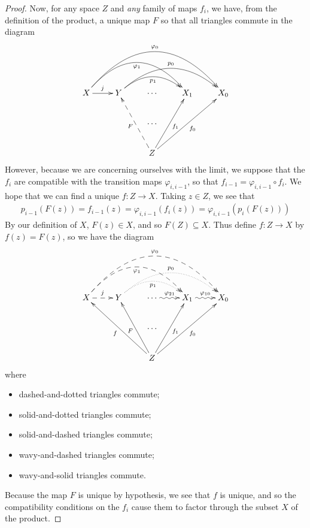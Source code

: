 \begin{proof}
        Now, for any space $Z$ and \emph{any} family of maps $f_i$, we have, from the definition of the product, a unique map $F$ so that all triangles commute in the diagram
        \begin{displaymath}
          \xymatrix{
            X \ar[r]^j \ar@/^37pt/[rrr]_{\varphi_1} \ar@/^50pt/[rrrr]^{\varphi_0}
            & Y \ar@/^20pt/[rr]_{p_1} \ar@/^30pt/[rrr]^{p_0}
            & \cdots
            & X_1
            & X_0
            \\ && \cdots \\
            && Z \ar@{-->}[uul]^F \ar[uur]_{f_1} \ar[uurr]_{f_0}
          }
        \end{displaymath}
        However, because we are concerning ourselves with the limit, we suppose that the $f_i$ are compatible with the transition maps $\varphi_{i,i-1}$, so that $f_{i-1} = \varphi_{i,i-1}\circ f_i$.
        We hope that we can find a unique $f:Z\rightarrow X$.
        Taking $z\in Z$, we see that
        \begin{align*}
          p_{i-1}(F(z)) = f_{i-1}(z) = \varphi_{i,i-1}(f_i(z)) = \varphi_{i,i-1}(p_i(F(z)))
        \end{align*}
        By our definition of $X$, $F(z)\in X$, and so $F(Z)\subseteq X$.
        Thus define $f:Z\rightarrow X$ by $f(z) = F(z)$, so we have the diagram
        \begin{displaymath}
          \xymatrix{
            X \ar@{-->}[r]^j \ar@{-->}@/^37pt/[rrr]_{\varphi_1} \ar@{-->}@/^50pt/[rrrr]^{\varphi_0}
            & Y \ar@/^20pt/@{..>}[rr]_{p_1} \ar@/^30pt/@{..>}[rrr]^{p_0}
            & \cdots \ar@{~>}[r]^{\varphi_{21}}
            & X_1 \ar@{~>}[r]^{\varphi_{10}}
            & X_0
            \\ && \cdots \\
            && Z \ar[uull]^f \ar[uul]^F \ar[uur]_{f_1} \ar[uurr]_{f_0}
          }
        \end{displaymath}
        where
        \begin{multicols}{2}
          \begin{itemize}
            \item dashed-and-dotted triangles commute;
            \item solid-and-dotted triangles commute;
            \item solid-and-dashed triangles commute;
            \item wavy-and-dashed triangles commute;
            \item wavy-and-solid triangles commute.
          \end{itemize}
        \end{multicols}
        Because the map $F$ is unique by hypothesis, we see that $f$ is unique, and so the compatibility conditions on the $f_i$ cause them to factor through the subset $X$ of the product.
      \end{proof}

